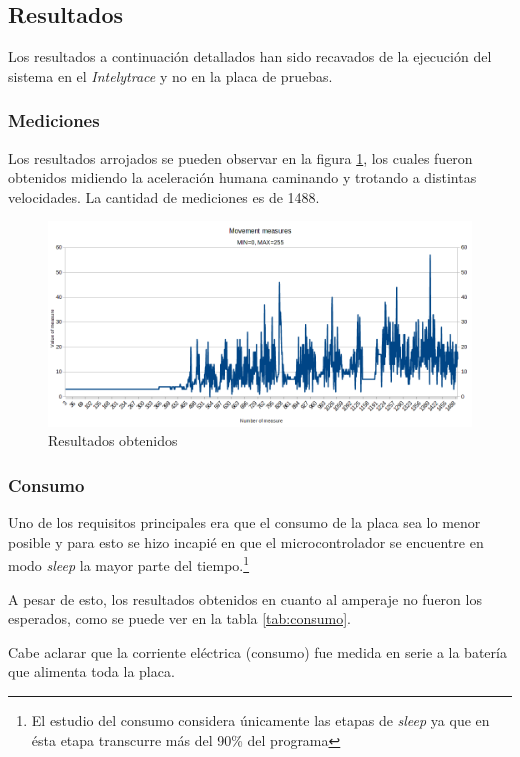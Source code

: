 \documentclass{article}
\newcommand{ \fnsleep }{\footnote{El estudio del consumo considera únicamente las etapas de \emph{sleep} ya que en ésta etapa transcurre más del 90\% del programa}}
\begin{document}
    \subsection{Resultados}
    Los resultados a continuación detallados han sido recavados de la ejecución
    del sistema en el \emph{Intelytrace} y no en la placa de pruebas.

    \subsubsection{Mediciones}
    Los resultados arrojados se pueden observar en la figura 
    \ref{fig:resultados_modulo}, los cuales fueron obtenidos midiendo la 
    aceleración humana caminando y trotando a distintas velocidades. La 
    cantidad de mediciones es de 1488.

    \begin{figure}[h]
        \includegraphics[width=1.0 \textwidth, center]{results_module.png}
        \caption{Resultados obtenidos}
        \label{fig:resultados_modulo}
    \end{figure}

    \subsubsection{Consumo}
    Uno de los requisitos principales era que el consumo de la placa sea lo 
    menor posible y para esto se hizo incapié en que el microcontrolador se 
    encuentre en modo \emph{sleep} la mayor parte del tiempo.\fnsleep \par
    A pesar de esto, los resultados obtenidos en cuanto al amperaje no fueron
    los esperados, como se puede ver en la tabla \ref{tab:consumo}. \par
    Cabe aclarar que la corriente eléctrica (consumo) fue medida en serie
    a la batería que alimenta toda la placa.
\end{document}
